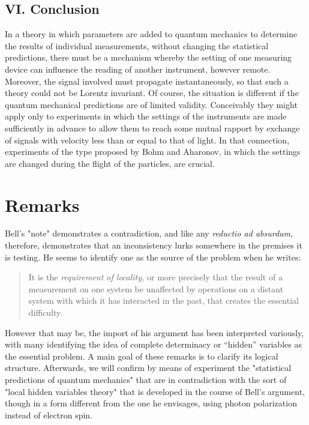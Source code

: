 \subsection*{VI. Conclusion}
In a theory in which parameters are added to quantum mechanics to determine the results of individual
measurements, without changing the statistical predictions, there must be a mechanism whereby the setting
of one measuring device can influence the reading of another instrument, however remote. Moreover,
the signal involved must propagate instantaneously, so that such a theory could not be Lorentz invariant.
Of course, the situation is different if the quantum mechanical predictions are of limited validity.
Conceivably they might apply only to experiments in which the settings of the instruments are made sufficiently
in advance to allow them to reach some mutual rapport by exchange of signals with velocity less
than or equal to that of light. In that connection, experiments of the type proposed by Bohm and Aharonov, in which the settings are changed during the flight of the particles, are crucial.

\section*{Remarks}

Bell's "note" demonstrates a contradiction, and like any \emph{reductio ad absurdum,} therefore, 
demonstrates that an inconsistency lurks somewhere in the premises it is testing. He seems to
identify one as the source of the problem when he writes: 
\begin{quote}
It is the \emph{requirement of locality,} or more precisely that the result of a measurement on one system be unaffected by operations on a distant system with which it has interacted in the past, that creates the essential difficulty.
\end{quote}
However that may be, the import of his argument has been interpreted variously, with many identifying the idea of complete determinacy or ``hidden'' variables as the essential problem. A main goal of these remarks is to clarify its logical structure. Afterwards, we will confirm by means of experiment the "statistical predictions of quantum mechanics" that are in contradiction with the sort of "local hidden variables theory" that is developed in the course of Bell's argument, though in a form different from the one he envisages, using photon polarization instead of electron spin.

